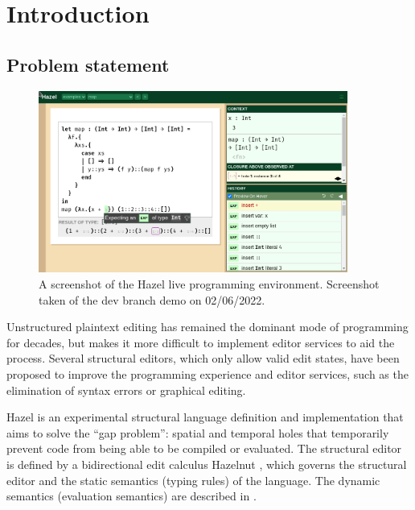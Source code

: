 \section{Introduction}
\label{sec:introduction}

\subsection{Problem statement}
\label{sec:prob_stmt}

\begin{figure}
  \centering
  \includegraphics[width=4in]{img/hazel_ui.png}
  \caption[Screenshot of the Hazel live programming environment.]{A screenshot of the Hazel live programming environment. Screenshot taken of the dev branch demo\footnotemark{} on 02/06/2022.}
  \label{fig:screenshot-hazel-ui}
\end{figure}


Unstructured plaintext editing has remained the dominant mode of programming for decades, but makes it more difficult to implement editor services to aid the process. Several structural editors, which only allow valid edit states, have been proposed to improve the programming experience and editor services, such as the elimination of syntax errors or graphical editing.


Hazel is an experimental structural language definition and implementation that aims to solve the ``gap problem'': spatial and temporal holes that temporarily prevent code from being able to be compiled or evaluated. The structural editor is defined by a bidirectional edit calculus Hazelnut \cite{conf/popl/Hazelnut17}, which governs the structural editor and the static semantics (typing rules) of the language. The dynamic semantics (evaluation semantics) are described in \cite{conf/popl/HazelnutLive19}.

